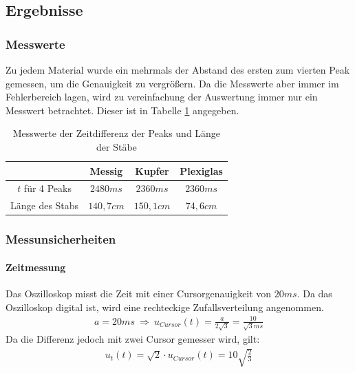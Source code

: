 \documentclass[11pt, a4paper]{article}
\begin{document}
    \subsection{Ergebnisse}
    \subsubsection{Messwerte}
    Zu jedem Material wurde ein mehrmals der Abstand des ersten zum
    vierten Peak gemessen, um die Genauigkeit zu vergrößern. Da die Messwerte aber immer im Fehlerbereich lagen,
    wird zu vereinfachung der Auswertung immer nur ein Messwert betrachtet. Dieser ist in Tabelle \ref{ex:mess1}
    angegeben. 
    \begin{table}[!th]
        \centering
        \begin{tabular}{c | c | c | c}
           & Messig & Kupfer & Plexiglas \\ \hline
            $ t $ für 4 Peaks & $ 2480ms $ & $ 2360ms $ & $ 2360ms $ \\ \hline
            Länge des Stabs & $140,7cm$ & $150,1cm$ & $74,6cm$ \\
        \end{tabular}
        \caption{Messwerte der Zeitdifferenz der Peaks und Länge der  Stäbe}
        \label{ex:mess1}
    \end{table}
    \subsubsection{Messunsicherheiten}
    \paragraph{Zeitmessung}
    Das Oszilloskop misst die Zeit mit einer Cursorgenauigkeit von $ 20ms $. Da das Oszilloskop digital ist, wird
    eine rechteckige Zufallsverteilung angenommen.
    \begin{align}
        a = 20ms \ \Rightarrow \ u_{Cursor}(t) = \frac{a}{2 \sqrt{3}} = \frac{10}{\sqrt{3}ms}
    \end{align}
    Da die Differenz jedoch mit zwei Cursor gemesser wird, gilt:
    \begin{align} \label{eqt}
        u_{t}(t) = \sqrt{2} \cdot u_{Cursor}(t) = 10\sqrt{\frac{2}{3}}
    \end{align}
\end{document}

